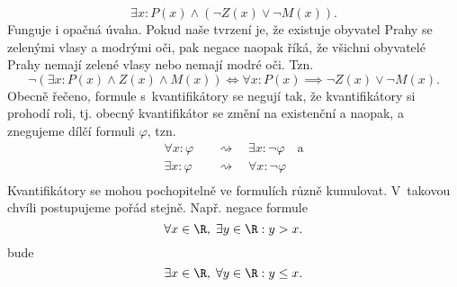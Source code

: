 \begin{equation*}
    \exists x : P(x)\land (\neg Z(x) \lor \neg M(x)).
\end{equation*}
Funguje i opačná úvaha. Pokud naše tvrzení je, že existuje obyvatel Prahy se zelenými vlasy a modrými oči, pak negace naopak říká, že všichni obyvatelé Prahy nemají zelené vlasy nebo nemají modré oči. Tzn.
\begin{equation*}
    \neg(\exists x : P(x)\land Z(x) \land M(x)) \iff \forall x : P(x)\implies \neg Z(x) \lor \neg M(x).
\end{equation*}
Obecně řečeno, formule s~kvantifikátory se negují tak, že kvantifikátory si prohodí roli, tj. obecný kvantifikátor se změní na existenční a naopak, a znegujeme dílčí formuli $\varphi$, tzn.
\begin{align*}
    \forall x : \varphi\quad&\rightsquigarrow\quad\exists x : \neg\varphi\quad\text{a}\\
    \exists x : \varphi\quad&\rightsquigarrow\quad\forall x : \neg\varphi\\
\end{align*}
Kvantifikátory se mohou pochopitelně ve formulích různě kumulovat. V~takovou chvíli postupujeme pořád stejně. Např. negace formule
\begin{equation*}
    \forall x\in\R,\;\exists y\in\R : y > x.
\end{equation*}
bude
\begin{equation*}
    \exists x\in\R,\;\forall y\in\R : y \leq x.
\end{equation*}